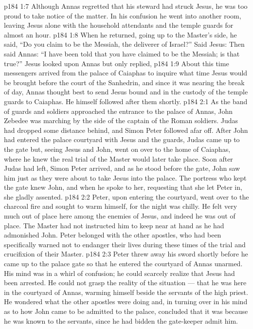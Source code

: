 \vs p184 1:7 Although Annas regretted that his steward had struck Jesus, he was too proud to take notice of the matter. In his confusion he went into another room, leaving Jesus alone with the household attendants and the temple guards for almost an hour.
\vs p184 1:8 When he returned, going up to the Master’s side, he said, “Do you claim to be the Messiah, the deliverer of Israel?” Said Jesus:  Then said Annas: “I have been told that you have claimed to be the Messiah; is that true?” Jesus looked upon Annas but only replied, 
\vs p184 1:9 About this time messengers arrived from the palace of Caiaphas to inquire what time Jesus would be brought before the court of the Sanhedrin, and since it was nearing the break of day, Annas thought best to send Jesus bound and in the custody of the temple guards to Caiaphas. He himself followed after them shortly.
\vs p184 2:1 As the band of guards and soldiers approached the entrance to the palace of Annas, John Zebedee was marching by the side of the captain of the Roman soldiers. Judas had dropped some distance behind, and Simon Peter followed afar off. After John had entered the palace courtyard with Jesus and the guards, Judas came up to the gate but, seeing Jesus and John, went on over to the home of Caiaphas, where he knew the real trial of the Master would later take place. Soon after Judas had left, Simon Peter arrived, and as he stood before the gate, John saw him just as they were about to take Jesus into the palace. The portress who kept the gate knew John, and when he spoke to her, requesting that she let Peter in, she gladly assented.
\vs p184 2:2 Peter, upon entering the courtyard, went over to the charcoal fire and sought to warm himself, for the night was chilly. He felt very much out of place here among the enemies of Jesus, and indeed he was out of place. The Master had not instructed him to keep near at hand as he had admonished John. Peter belonged with the other apostles, who had been specifically warned not to endanger their lives during these times of the trial and crucifixion of their Master.
\vs p184 2:3 Peter threw away his sword shortly before he came up to the palace gate so that he entered the courtyard of Annas unarmed. His mind was in a whirl of confusion; he could scarcely realize that Jesus had been arrested. He could not grasp the reality of the situation --- that he was here in the courtyard of Annas, warming himself beside the servants of the high priest. He wondered what the other apostles were doing and, in turning over in his mind as to how John came to be admitted to the palace, concluded that it was because he was known to the servants, since he had bidden the gate\hyp{}keeper admit him.
